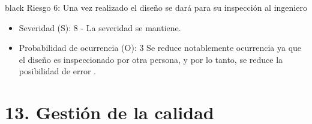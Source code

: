 \documentclass[11pt]{charter}
\begin{document}
\begin{consigna}{black}
Riesgo 6: Una vez realizado el diseño se dará para su inspección al ingeniero \supname
\begin{itemize}
\item Severidad (S): 8 - La severidad se mantiene.
\item Probabilidad de ocurrencia (O): 3 Se reduce notablemente ocurrencia ya que el
diseño es inspeccionado por otra persona, y por lo tanto, se reduce la posibilidad de
error .
\end{itemize}

\end{consigna}


\section{13. Gestión de la calidad}
\label{sec:calidad}
\end{document}
